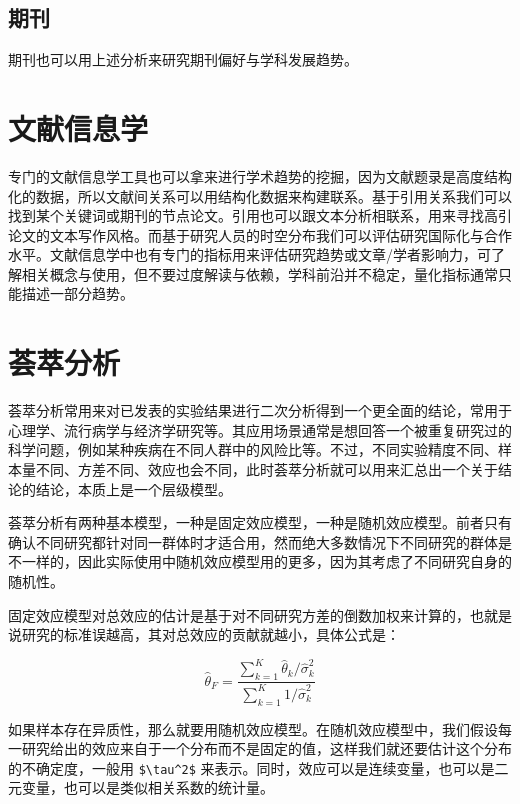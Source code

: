 \documentclass[]{tufte-book}
\begin{document}
\hypertarget{ux671fux520a}{%
\subsection{期刊}\label{ux671fux520a}}

期刊也可以用上述分析来研究期刊偏好与学科发展趋势。

\hypertarget{ux6587ux732eux4fe1ux606fux5b66}{%
\section{文献信息学}\label{ux6587ux732eux4fe1ux606fux5b66}}

专门的文献信息学工具也可以拿来进行学术趋势的挖掘，因为文献题录是高度结构化的数据，所以文献间关系可以用结构化数据来构建联系。基于引用关系我们可以找到某个关键词或期刊的节点论文。引用也可以跟文本分析相联系，用来寻找高引论文的文本写作风格。而基于研究人员的时空分布我们可以评估研究国际化与合作水平。文献信息学中也有专门的指标用来评估研究趋势或文章/学者影响力，可了解相关概念与使用，但不要过度解读与依赖，学科前沿并不稳定，量化指标通常只能描述一部分趋势。

\hypertarget{ux835fux8403ux5206ux6790}{%
\section{荟萃分析}\label{ux835fux8403ux5206ux6790}}

荟萃分析常用来对已发表的实验结果进行二次分析得到一个更全面的结论，常用于心理学、流行病学与经济学研究等。其应用场景通常是想回答一个被重复研究过的科学问题，例如某种疾病在不同人群中的风险比等。不过，不同实验精度不同、样本量不同、方差不同、效应也会不同，此时荟萃分析就可以用来汇总出一个关于结论的结论，本质上是一个层级模型。

荟萃分析有两种基本模型，一种是固定效应模型，一种是随机效应模型。前者只有确认不同研究都针对同一群体时才适合用，然而绝大多数情况下不同研究的群体是不一样的，因此实际使用中随机效应模型用的更多，因为其考虑了不同研究自身的随机性。

固定效应模型对总效应的估计是基于对不同研究方差的倒数加权来计算的，也就是说研究的标准误越高，其对总效应的贡献就越小，具体公式是：

\[\hat\theta_F = \frac{\sum\limits_{k=1}^K \hat\theta_k/ \hat\sigma^2_k}{\sum\limits_{k=1}^K 1/\hat\sigma^2_k}\]

如果样本存在异质性，那么就要用随机效应模型。在随机效应模型中，我们假设每一研究给出的效应来自于一个分布而不是固定的值，这样我们就还要估计这个分布的不确定度，一般用 \texttt{\$\textbackslash{}tau\^{}2\$} 来表示。同时，效应可以是连续变量，也可以是二元变量，也可以是类似相关系数的统计量。
\end{document}
